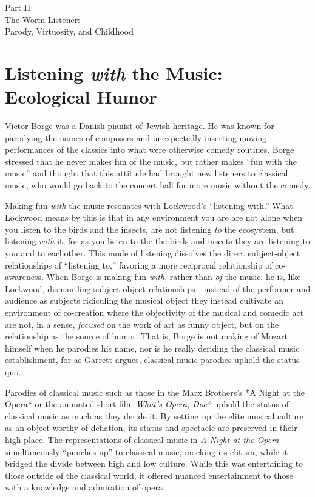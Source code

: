 \documentclass[12pt,letterpaper]{article}
\begin{document}
	\newpage
	\thispagestyle{empty}
	\vspace*{30pt}
	\begin{center}
	{\Huge Part II\\ 
	\Large The Worm-Listener:\\
	Parody, Virtuosity, and Childhood}
	\end{center}


	\newpage
	\section*{Listening \textit{with} the Music: Ecological Humor} 

	Victor Borge was a Danish pianist of Jewish heritage. He was known for 
	parodying the names of composers and unexpectedly inserting moving 
	performances of the classics into what were otherwise comedy 
	routines.\autocite[255]{Garrett}  
	Borge stressed that he never makes fun of the music, but rather makes 
	``fun with the music'' and thought that this attitude had brought new 
	listeners to classical music, who would go back to the concert hall for
	more music without the comedy.\autocite[256]{Garrett}  

	Making fun \textit{with} the music resonates with Lockwood's 
	``listening with.'' What Lockwood means by this is that in any 
	environment you are are not alone when you listen to the birds and the
	insects, are not listening \textit{to} the ecosystem, but listening 
	\textit{with} it, for as you listen to the the birds and insects they
	are listening to you and to eachother. This mode of listening dissolves
	 the direct 
	subject-object relationships of ``listening to,'' favoring a more 
	reciprocal relationship of co-awareness.  When Borge is making fun 
	\textit{with}, rather than \textit{of} the music, he is, like Lockwood, 
	dismantling subject-object relationships---instead of the performer and 
	audience as subjects ridiculing the musical object they instead 
	cultivate an environment of co-creation where the 
	objectivity of the musical and comedic act are not, in a sense, 
	\textit{focused} on the work of art as funny object, but on the 
	relationship as the source of humor. That is, Borge is not making of 
	Mozart himself when he parodies his name, nor is he really deriding the
 	classical music establishment, for as Garrett argues, classical music 
	parodies uphold the status quo. 

	Parodies of classical music such as those in the Marx Brothers's *A 
	Night at the Opera* or the animated short film \textit{What's Opera, 
	Doc?} uphold the status of classical music as much as they deride it. By
	setting up the elite musical culture as an object worthy of deflation, 
	its status and spectacle are preserved in their high 
	place.\autocite[252]{Garrett} The representations of classical music in
	\textit{A Night at the Opera} simultaneously ``punches up'' to classical
	music, mocking its elitism, while it bridged the divide between high and
	low culture. While this was entertaining to those outside of the 
	classical world, it offered nuanced entertainment to those with a 
	knowledge and admiration of opera.\autocite[251]{Garrett} 
\end{document}
